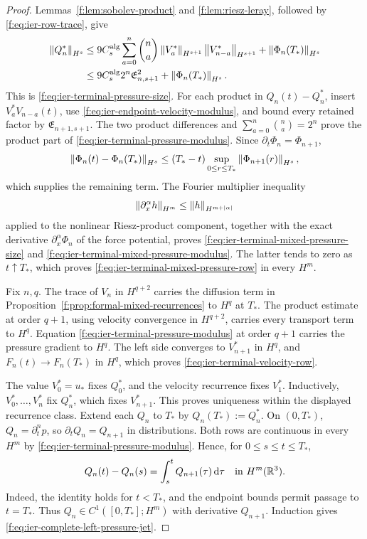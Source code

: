\begin{proof}
Lemmas~\ref{f:lem:sobolev-product} and \ref{f:lem:riesz-leray}, followed by
\eqref{f:eq:ier-row-trace}, give
\begin{align*}
 \left\lVert Q_n^*\right\rVert_{H^s}
 &\le9C_s^{\rm alg}\sum_{a=0}^{n}\binom na
 \left\lVert V_a^*\right\rVert_{H^{s+1}}\left\lVert V_{n-a}^*\right\rVert_{H^{s+1}}
 +\left\lVert \Phi_n(T_*)\right\rVert_{H^s}\\
 &\le9C_s^{\rm alg}2^n\mathfrak E_{n,s+1}^2
 +\left\lVert \Phi_n(T_*)\right\rVert_{H^s}.
\end{align*}
This is \eqref{f:eq:ier-terminal-pressure-size}.
For each product in \(Q_n(t)-Q_n^*\), insert
\(V_a^*V_{n-a}(t)\), use
\eqref{f:eq:ier-endpoint-velocity-modulus}, and bound every retained factor by
\(\mathfrak E_{n+1,s+1}\).  The two product differences and
\(\sum_{a=0}^{n}\binom na=2^n\) prove
the product part of \eqref{f:eq:ier-terminal-pressure-modulus}.  Since
\(\partial_t\Phi_n=\Phi_{n+1}\),
\[
 \left\lVert \Phi_n(t)-\Phi_n(T_*)\right\rVert_{H^s}
 \le (T_*-t)\sup_{0\le r\le T_*}\left\lVert \Phi_{n+1}(r)\right\rVert_{H^s},
\]
which supplies the remaining term.  The Fourier multiplier inequality
\[
 \left\lVert \partial_x^\alpha h\right\rVert_{H^m}
 \le\left\lVert h\right\rVert_{H^{m+|\alpha|}}
\]
applied to the nonlinear Riesz-product component, together with the exact
derivative \(\partial_x^\alpha\Phi_n\) of the force potential, proves
\eqref{f:eq:ier-terminal-mixed-pressure-size} and
\eqref{f:eq:ier-terminal-mixed-pressure-modulus}.  The latter tends to zero
as \(t\uparrow T_*\), which proves
\eqref{f:eq:ier-terminal-mixed-pressure-row} in every \(H^m\).

Fix \(n,q\).  The trace of \(V_n\) in \(H^{q+2}\) carries the diffusion
term in Proposition~\ref{f:prop:formal-mixed-recurrences} to \(H^q\) at
\(T_*\).  The product estimate at order \(q+1\), using velocity convergence
in \(H^{q+2}\), carries every transport term to \(H^q\).  Equation
\eqref{f:eq:ier-terminal-pressure-modulus} at order \(q+1\) carries the pressure
gradient to \(H^q\).  The left side converges to \(V_{n+1}^*\) in \(H^q\),
and \(F_n(t)\to F_n(T_*)\) in \(H^q\), which proves
\eqref{f:eq:ier-terminal-velocity-row}.

The value \(V_0^*=u_*\) fixes \(Q_0^*\), and the velocity recurrence fixes
\(V_1^*\).  Inductively, \(V_0^*,\ldots,V_n^*\) fix \(Q_n^*\), which fixes
\(V_{n+1}^*\).  This proves uniqueness within the displayed recurrence
class.  Extend each \(Q_n\) to \(T_*\) by
\(Q_n(T_*):=Q_n^*\).  On \((0,T_*)\),
\(Q_n=\partial_t^np\), so \(\partial_tQ_n=Q_{n+1}\) in distributions.
Both rows are continuous in every \(H^m\) by
\eqref{f:eq:ier-terminal-pressure-modulus}.  Hence, for
\(0\le s\le t\le T_*\),
\begin{equation}
 Q_n(t)-Q_n(s)=\int_s^tQ_{n+1}(\tau)\,\mathrm d\tau
 \quad\text{in }H^m(\mathbb R^3).
 \label{f:eq:ier-pressure-banach-identity}
\end{equation}
Indeed, the identity holds for \(t<T_*\), and the endpoint bounds permit
passage to \(t=T_*\).  Thus
\(Q_n\in C^1([0,T_*];H^m)\) with derivative \(Q_{n+1}\).  Induction gives
\eqref{f:eq:ier-complete-left-pressure-jet}.
\end{proof}

